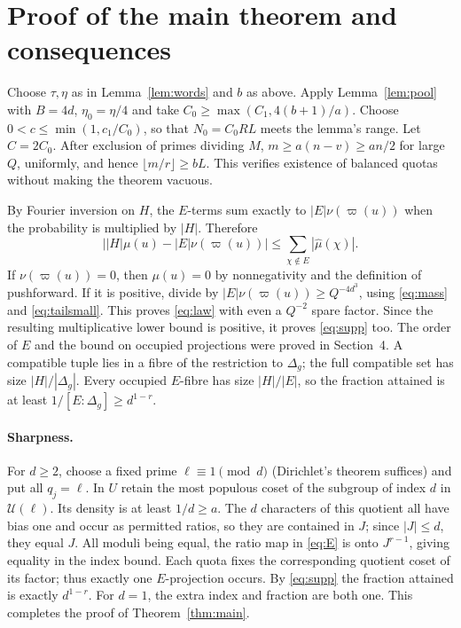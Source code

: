 \documentclass[11pt]{article}
\theoremstyle{remark}\newtheorem{remark}[theorem]{Remark}
\newcommand{\U}{\mathcal U}
\newcommand{\abs}[1]{\left|#1\right|}
\begin{document}
\section{Proof of the main theorem and consequences}
Choose $\tau,\eta$ as in Lemma~\ref{lem:words} and $b$ as above. Apply Lemma~\ref{lem:pool} with $B=4d$, $\eta_0=\eta/4$ and take $C_0\ge\max(C_1,4(b+1)/a)$. Choose $0<c\le\min(1,c_1/C_0)$, so that $N_0=C_0RL$ meets the lemma's range. Let $C=2C_0$. After exclusion of primes dividing $M$, $m\ge a(n-v)\ge a n/2$ for large $Q$, uniformly, and hence $\lfloor m/r\rfloor\ge bL$. This verifies existence of balanced quotas without making the theorem vacuous.

By Fourier inversion on $H$, the $E$-terms sum exactly to $|E|\nu(\varpi(u))$ when the probability is multiplied by $|H|$. Therefore
\[
\abs{|H|\mu(u)-|E|\nu(\varpi(u))}\le\sum_{\chi\notin E}|\widehat\mu(\chi)|.
\]
If $\nu(\varpi(u))=0$, then $\mu(u)=0$ by nonnegativity and the definition of pushforward. If it is positive, divide by $|E|\nu(\varpi(u))\ge Q^{-4d^3}$, using \eqref{eq:mass} and \eqref{eq:tailsmall}. This proves \eqref{eq:law} with even a $Q^{-2}$ spare factor. Since the resulting multiplicative lower bound is positive, it proves \eqref{eq:supp} too. The order of $E$ and the bound on occupied projections were proved in Section~4. A compatible tuple lies in a fibre of the restriction to $\Delta_g$; the full compatible set has size $|H|/|\Delta_g|$. Every occupied $E$-fibre has size $|H|/|E|$, so the fraction attained is at least $1/[E:\Delta_g]\ge d^{1-r}$.

\paragraph{Sharpness.} For $d\ge2$, choose a fixed prime $\ell\equiv1\pmod d$ (Dirichlet's theorem suffices) and put all $q_j=\ell$. In $U$ retain the most populous coset of the subgroup of index $d$ in $\U(\ell)$. Its density is at least $1/d\ge a$. The $d$ characters of this quotient all have bias one and occur as permitted ratios, so they are contained in $J$; since $|J|\le d$, they equal $J$. All moduli being equal, the ratio map in \eqref{eq:E} is onto $J^{r-1}$, giving equality in the index bound. Each quota fixes the corresponding quotient coset of its factor; thus exactly one $E$-projection occurs. By \eqref{eq:supp} the fraction attained is exactly $d^{1-r}$. For $d=1$, the extra index and fraction are both one. This completes the proof of Theorem~\ref{thm:main}.
\end{document}
